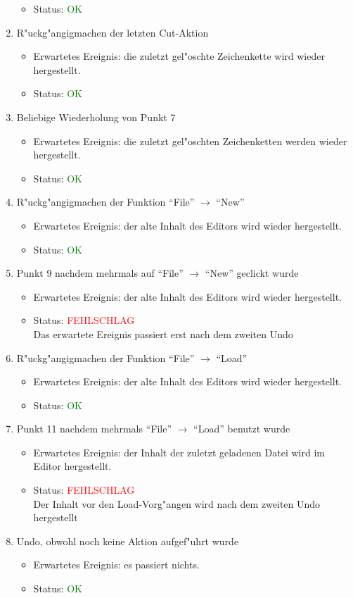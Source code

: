 \begin{enumerate}
\begin{itemize}
\item Status: \textcolor{green}{OK}
\end{itemize}
\item R"uckg"angigmachen der letzten Cut-Aktion
\begin{itemize}
\item Erwartetes Ereignis: die zuletzt gel"oschte Zeichenkette wird wieder hergestellt. 
\item Status: \textcolor{green}{OK}
\end{itemize}
\item Beliebige Wiederholung von Punkt 7
\begin{itemize}
\item Erwartetes Ereignis: die zuletzt gel"oschten Zeichenketten werden wieder hergestellt. 
\item Status: \textcolor{green}{OK}
\end{itemize}
\item R"uckg"angigmachen der Funktion "`File"' $\rightarrow$ "`New"'
\begin{itemize}
\item Erwartetes Ereignis: der alte Inhalt des Editors wird wieder hergestellt. 
\item Status: \textcolor{green}{OK}
\end{itemize}
\item Punkt 9 nachdem mehrmals auf "`File"' $\rightarrow$ "`New"' geclickt wurde
\begin{itemize}
\item Erwartetes Ereignis: der alte Inhalt des Editors wird wieder hergestellt. 
\item Status: \textcolor{red}{FEHLSCHLAG} \\
Das erwartete Ereignis passiert erst nach dem zweiten Undo
\end{itemize}
\item R"uckg"angigmachen der Funktion "`File"' $\rightarrow$ "`Load"'
\begin{itemize}
\item Erwartetes Ereignis: der alte Inhalt des Editors wird wieder hergestellt. 
\item Status: \textcolor{green}{OK}
\end{itemize}
\item Punkt 11 nachdem mehrmals "`File"' $\rightarrow$ "`Load"' benutzt wurde
\begin{itemize}
\item Erwartetes Ereignis: der Inhalt der zuletzt geladenen Datei wird im Editor hergestellt. 
\item Status: \textcolor{red}{FEHLSCHLAG} \\
Der Inhalt vor den Load-Vorg"angen wird nach dem zweiten Undo hergestellt
\end{itemize}
\item Undo, obwohl noch keine Aktion aufgef"uhrt wurde
\begin{itemize}
\item Erwartetes Ereignis: es passiert nichts. 
\item Status: \textcolor{green}{OK}
\end{itemize}
\end{enumerate}
